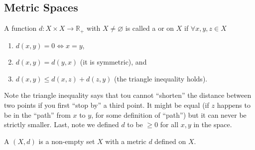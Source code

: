 \documentclass{article}
\begin{document}
\subsection{Metric Spaces}
\label{sub:metric_spaces}

\begin{definition}[distance]\label{def:lecture1_distance}
  A function $d: X \times X \to \mathbb{R}_+$ with $X \ne \varnothing$ is called a  or  on $X$ if $\forall x, y, z \in X$
  \begin{enumerate}
    \item $d(x, y) = 0 \iff x = y$,

    \item $d(x, y) = d(y, x)$ (it is symmetric), and

    \item $d(x, y) \le d(x, z) + d(z, y)$ (the triangle inequality holds).
  \end{enumerate}
\end{definition}

Note the triangle inequality says that tou cannot ``shorten'' the distance between two points if you first ``stop by'' a third point. It might be equal (if $z$ happens to be in the ``path'' from $x$ to $y$, for some definition of ``path'') but it can never be strictly smaller. Last, note we defined $d$ to be $\ge 0$ for all $x, y$ in the space.

\begin{definition}\label{def:lecture1_space}
  A  $(X, d)$ is a non-empty set $X$ with a metric $d$ defined on $X$.
\end{definition}
\end{document}
